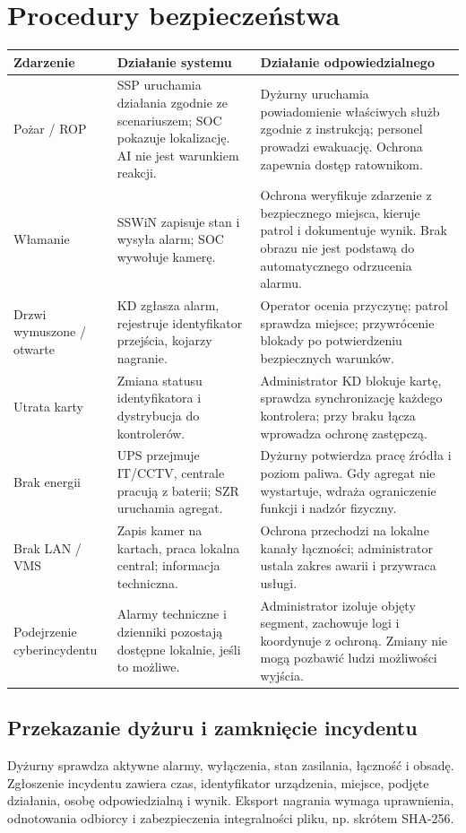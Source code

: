 \section{Procedury bezpieczeństwa}
\begingroup\small
\begin{tabularx}{\linewidth}{@{}P{23mm}Y Y@{}}
\toprule\textbf{Zdarzenie} & \textbf{Działanie systemu} & \textbf{Działanie odpowiedzialnego}\\\midrule
Pożar / ROP & SSP uruchamia działania zgodnie ze scenariuszem; SOC pokazuje lokalizację. AI nie jest warunkiem reakcji. & Dyżurny uruchamia powiadomienie właściwych służb zgodnie z instrukcją; personel prowadzi ewakuację. Ochrona zapewnia dostęp ratownikom.\\
Włamanie & SSWiN zapisuje stan i wysyła alarm; SOC wywołuje kamerę. & Ochrona weryfikuje zdarzenie z bezpiecznego miejsca, kieruje patrol i dokumentuje wynik. Brak obrazu nie jest podstawą do automatycznego odrzucenia alarmu.\\
Drzwi wymuszone / otwarte & KD zgłasza alarm, rejestruje identyfikator przejścia, kojarzy nagranie. & Operator ocenia przyczynę; patrol sprawdza miejsce; przywrócenie blokady po potwierdzeniu bezpiecznych warunków.\\
Utrata karty & Zmiana statusu identyfikatora i dystrybucja do kontrolerów. & Administrator KD blokuje kartę, sprawdza synchronizację każdego kontrolera; przy braku łącza wprowadza ochronę zastępczą.\\
Brak energii & UPS przejmuje IT/CCTV, centrale pracują z baterii; SZR uruchamia agregat. & Dyżurny potwierdza pracę źródła i poziom paliwa. Gdy agregat nie wystartuje, wdraża ograniczenie funkcji i nadzór fizyczny.\\
Brak LAN / VMS & Zapis kamer na kartach, praca lokalna central; informacja techniczna. & Ochrona przechodzi na lokalne kanały łączności; administrator ustala zakres awarii i przywraca usługi.\\
Podejrzenie cyberincydentu & Alarmy techniczne i dzienniki pozostają dostępne lokalnie, jeśli to możliwe. & Administrator izoluje objęty segment, zachowuje logi i koordynuje z ochroną. Zmiany nie mogą pozbawić ludzi możliwości wyjścia.\\\bottomrule
\end{tabularx}
\endgroup

\subsection*{Przekazanie dyżuru i zamknięcie incydentu}
Dyżurny sprawdza aktywne alarmy, wyłączenia, stan zasilania, łączność i obsadę. Zgłoszenie incydentu zawiera czas, identyfikator urządzenia, miejsce, podjęte działania, osobę odpowiedzialną i wynik. Eksport nagrania wymaga uprawnienia, odnotowania odbiorcy i zabezpieczenia integralności pliku, np. skrótem SHA-256.

